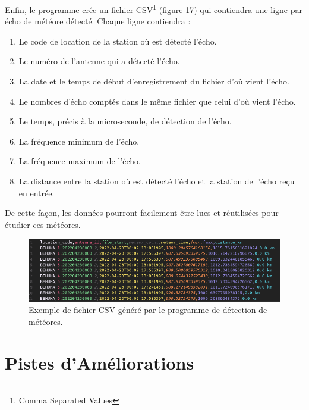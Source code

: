 \documentclass[11pt]{article}
\begin{document}
Enfin, le programme crée un fichier CSV\footnote{Comma Separated Values} (figure 17) qui contiendra une ligne par écho de météore détecté.
Chaque ligne contiendra :
\begin{enumerate}
    \item Le code de location de la station où est détecté l'écho.
    \item Le numéro de l'antenne qui a détecté l'écho.
    \item La date et le temps de début d'enregistrement du fichier d'où vient l'écho.
    \item Le nombres d'écho comptés dans le même fichier que celui d'où vient l'écho.
    \item Le temps, précis à la microseconde, de détection de l'écho.
    \item La fréquence minimum de l'écho.
    \item La fréquence maximum de l'écho.
    \item La distance entre la station où est détecté l'écho et la station de l'écho reçu en entrée.
\end{enumerate}

De cette façon, les données pourront facilement être lues et réutilisées pour étudier ces météores.

\begin{figure}[t]
    \begin{center}
        \includegraphics[scale=0.44]{Screenshot from 2022-05-31 16-35-06.png}
        \caption{Exemple de fichier CSV généré par le programme de détection de météores.}
    \end{center}
\end{figure}

\newpage

\section{Pistes d'Améliorations}
\end{document}
